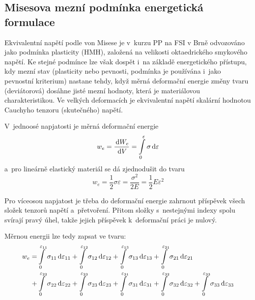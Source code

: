 
\subsection{Misesova mezní podmínka energetická formulace}
Ekvivalentní napětí podle von Misese je v~kurzu PP na FSI v Brně odvozováno jako podmínka plasticity (HMH), založená na velikosti oktaedrického smykového napětí.
Ke stejné podmínce lze však dospět i~na základě energetického přístupu, kdy mezní stav (plasticity nebo pevnosti, podmínka je používána i~jako pevnostní kriterium) nastane tehdy, když měrná deformační energie změny tvaru (deviátorová) dosáhne jisté mezní hodnoty, která je materiálovou charakteristikou.
Ve velkých deformacích je ekvivalentní napětí skalární hodnotou Cauchyho tenzoru (skutečného) napětí.

V~jednoosé napjatosti je měrná deformační energie
\begin{equation}
	w_e = \frac{\,\mathrm{d} W_e}{\,\mathrm{d} V} = \int\limits_0^\varepsilon \sigma \,\mathrm{d} \varepsilon
\end{equation}
a~pro lineárně elastický materiál se dá zjednodušit do tvaru
\begin{equation}
	w_e = \frac{1}{2} \sigma \varepsilon = \frac{\sigma^2}{2 E} = \frac{1}{2} E \varepsilon^2
\end{equation}

Pro víceosou napjatost je třeba do deformační energie zahrnout příspěvek všech složek tenzorů napětí a~přetvoření. Přitom složky s~nestejnými indexy spolu svírají pravý úhel, takže jejich příspěvek k~deformační práci je nulový.

Měrnou energii lze tedy zapsat ve tvaru:
\begin{equation}\begin{split}
	w_e
	= &\int\limits_{0}^{\varepsilon_{11}} \sigma_{11} \,\mathrm{d} \varepsilon_{11}
	+ \int\limits_{0}^{\varepsilon_{12}} \sigma_{12} \,\mathrm{d} \varepsilon_{12}
	+ \int\limits_{0}^{\varepsilon_{13}} \sigma_{13} \,\mathrm{d} \varepsilon_{13}
	+ \int\limits_{0}^{\varepsilon_{21}} \sigma_{21} \,\mathrm{d} \varepsilon_{21}\\
	+ &\int\limits_{0}^{\varepsilon_{22}} \sigma_{22} \,\mathrm{d} \varepsilon_{22}
	+ \int\limits_{0}^{\varepsilon_{23}} \sigma_{23} \,\mathrm{d} \varepsilon_{23}
	+ \int\limits_{0}^{\varepsilon_{31}} \sigma_{31} \,\mathrm{d} \varepsilon_{31}
	+ \int\limits_{0}^{\varepsilon_{32}} \sigma_{32} \,\mathrm{d} \varepsilon_{32}
	+ \int\limits_{0}^{\varepsilon_{33}} \sigma_{33} \,\mathrm{d} \varepsilon_{33}
\end{split}\end{equation}

